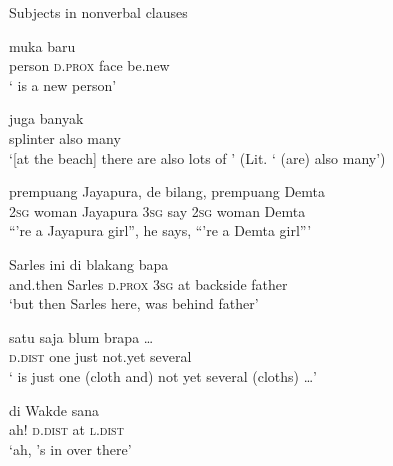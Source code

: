 \begin{styleExampleTitle}
Subjects in nonverbal clauses
\end{styleExampleTitle}

\ea
\label{Example_12.1}
 {} {muka} {baru}\\ %
 person  \textsc{d.prox}  face  be.new\\
\glt 
‘ is a new person’ \textstyleExampleSource{[080919-004-NP.0079]}
\z

\ea
\label{Example_12.2}
\gll {\ldots} {} {juga} {banyak}\\ %
  {} splinter  also  many\\
\glt 
‘[at the beach] there are also lots of ’ (Lit. ‘ (are) also many’) \textstyleExampleSource{[080917-006-CvHt.0008]}
\z

\ea
\label{Example_12.3}
 {prempuang} {Jayapura,} {de} {bilang,} {} {prempuang} {Demta}\\ %
 \textsc{2sg}  woman  Jayapura  \textsc{3sg}  say  \textsc{2sg}  woman  Demta\\
\glt 
``’re a Jayapura girl'', he says, ``’re a Demta girl''' \textstyleExampleSource{[081006-025-CvEx.0014]}
\z

\ea
\label{Example_12.4}
 {Sarles} {ini} {} {di} {blakang} {bapa}\\ %
 and.then  Sarles  \textsc{d.prox}  \textsc{3sg}  at  backside  father\\
\glt 
‘but then Sarles here,  was behind father’ \textstyleExampleSource{[081025-009b-Cv.0014]}
\z

\ea
\label{Example_12.5}
 {satu} {saja} {blum} {brapa} {\ldots}\\ %
 \textsc{d.dist}  one  just  not.yet  several  \\
 ‘ is just one (cloth and) not yet several (cloths) {\ldots}’ \textstyleExampleSource{[081006-029-CvEx.0011]}
\z

\ea
\label{Example_12.6}
 {} {di} {Wakde} {sana}\\ %
 ah!  \textsc{d.dist}  at    \textsc{l.dist}\\
\glt 
‘ah, ’s in  over there’ \textstyleExampleSource{[081006-016-Cv.0030]}
\z


